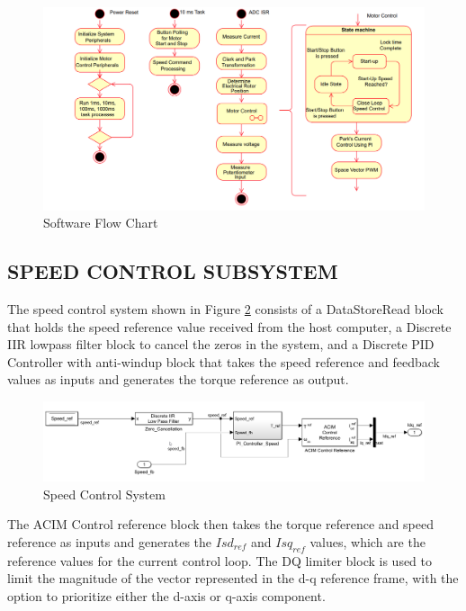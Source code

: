 \begin{figure}
	\centering
	\includegraphics[width=7in]{sections/section3/images/softwareflowchart.png}
	\caption{Software Flow Chart}
	\label{fig:Software Flow Chart}
\end{figure}



\subsection{SPEED CONTROL SUBSYSTEM}

The speed control system shown in Figure \ref{fig:speed_control_system} consists of a DataStoreRead block that holds the speed reference value received from the host computer, a Discrete IIR lowpass filter block to cancel the zeros in the system, and a Discrete PID Controller with anti-windup block that takes the speed reference and feedback values as inputs and generates the torque reference as output. 

\begin{figure}
	\centering
	\includegraphics[width=7in]{sections/section3/images/simulation/speedControl/speedController.png}
	\caption{Speed Control System}
	\label{fig:speed_control_system}
\end{figure}


The ACIM Control reference block then takes the torque reference and speed reference as inputs and generates the $Isd_{ref}$ and $Isq_{ref}$ values, which are the reference values for the current control loop. The DQ limiter block is used to limit the magnitude of the vector represented in the d-q reference frame, with the option to prioritize either the d-axis or q-axis component.



